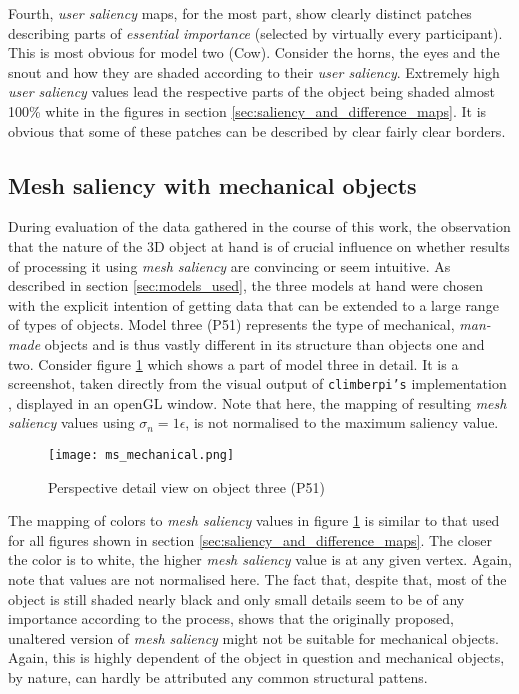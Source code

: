 Fourth, \textit{user saliency} maps, for the most part, show clearly distinct patches describing parts of \textit{essential importance} (selected by virtually every participant). This is most obvious for model two (Cow). Consider the horns, the eyes and the snout and how they are shaded according to their \textit{user saliency}. Extremely high \textit{user saliency} values lead the respective parts of the object being shaded almost 100\% white in the figures in section \ref{sec:saliency_and_difference_maps}. It is obvious that some of these patches can be described by clear fairly clear borders. 

		\subsection{Mesh saliency with mechanical objects}
		\label{sec:mesh_saliency_with_mechanical_objects}
During evaluation of the data gathered in the course of this work, the observation that the nature of the 3D object at hand is of crucial influence on whether results of processing it using \textit{mesh saliency} are convincing or seem intuitive. As described in section \ref{sec:models_used}, the three models at hand were chosen with the explicit intention of getting data that can be extended to a large range of types of objects. Model three (P51) represents the type of mechanical, \textit{man-made} objects and is thus vastly different in its structure than objects one and two. Consider figure \ref{fig:results_ms_mechanical} which shows a part of model three in detail. It is a screenshot, taken directly from the visual output of \texttt{climberpi's} implementation \cite{clms}, displayed in an openGL window. Note that here, the mapping of resulting \textit{mesh saliency} values using $\sigma_{n} = 1\epsilon$, is not normalised to the maximum saliency value.

\begin{figure}[!h]
	\centering
	\texttt{[image: ms\_mechanical.png]}\\ %
	\caption{Perspective detail view on object three (P51)}
	\label{fig:results_ms_mechanical}
\end{figure}

The mapping of colors to \textit{mesh saliency} values in figure \ref{fig:results_ms_mechanical} is similar to that used for all figures shown in section \ref{sec:saliency_and_difference_maps}. The closer the color is to white, the higher \textit{mesh saliency} value is at any given vertex. Again, note that values are not normalised here. The fact that, despite that, most of the object is still shaded nearly black and only small details seem to be of any importance according to the process, shows that the originally proposed, unaltered version of \textit{mesh saliency} might not be suitable for mechanical objects. Again, this is highly dependent of the object in question and mechanical objects, by nature, can hardly be attributed any common structural pattens.


